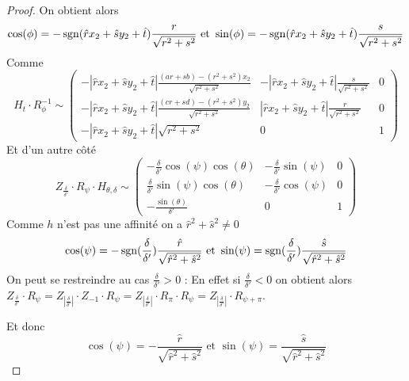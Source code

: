 \begin{proof}
 On obtient alors 
 \begin{equation*}
 \cos( \phi )= -\operatorname{sgn}(\hat r x_2 +\hat s y_2 +\hat t) \frac{r}{\sqrt{r^2 + s^2}} \text{ et } \sin( \phi )= -\operatorname{sgn}(\hat r x_2 +\hat s y_2 +\hat t) \frac{s}{\sqrt{r^2 + s^2}}
 \end{equation*}
 Comme 
 \begin{equation*}
 H_t \cdot R_{\phi}^{-1} \sim
 \begin{pmatrix}
 -|\hat r x_2 +\hat s y_2 +\hat t|\frac{(ar+sb)-(r^2 + s^2)x_2}{\sqrt{r^2 + s^2}}&-|\hat r x_2 +\hat s y_2 +\hat t|\frac{\hat s}{\sqrt{r^2 + s^2}}&0\\
 -|\hat r x_2 +\hat s y_2 +\hat t|\frac{(cr+sd)-(r^2 + s^2)y_2}{\sqrt{r^2 + s^2}}&|\hat r x_2 +\hat s y_2 +\hat t|\frac{r}{\sqrt{r^2 + s^2}}&0\\
 -|\hat r x_2 +\hat s y_2 +\hat t|\sqrt{r^2 + s^2}&0&1
 \end{pmatrix}
 \end{equation*}
 Et d'un autre côté 
 \begin{equation*}
Z_{\frac{\delta}{\delta'}} \cdot R_{\psi} \cdot H_{\theta,\delta}  \sim 
 \begin{pmatrix}
 -\frac{\delta}{\delta'}\cos(\psi)\cos(\theta)&
-\frac{\delta}{\delta'}\sin(\psi)&
0\\
\frac{\delta}{\delta'}\sin(\psi)\cos(\theta)&
-\frac{\delta}{\delta'}\cos(\psi)&
0\\
-\frac{\sin(\theta)}{\delta'}&
0&
1
 \end{pmatrix}
 \end{equation*}
Comme $h$ n'est pas une affinité on a $\hat r^2 + \hat s^2 \ne 0$ 
 \begin{equation*}
  \cos( \psi ) =- \operatorname{sgn}(\frac{\delta}{\delta'})\frac{\hat r}{\sqrt{\hat r^2 + \hat s^2}}\text{ et } \sin( \psi ) = \operatorname{sgn}(\frac{\delta}{\delta'})\frac{\hat s}{\sqrt{\hat r^2 + \hat s^2}}
 \end{equation*}
On peut se restreindre au cas $\frac{\delta}{\delta'}>0$ :
En effet si $\frac{\delta}{\delta'}<0$ on obtient alors $Z_{\frac{\delta}{\delta'}} \cdot R_{\psi}=Z_{\left|\frac{\delta}{\delta'}\right|}\cdot Z_{-1} \cdot R_{\psi}=Z_{\left|\frac{\delta}{\delta'}\right|}\cdot R_{\pi} \cdot R_{\psi}=Z_{\left|\frac{\delta}{\delta'}\right|}\cdot R_{\psi+\pi}$.


Et donc 
 \begin{equation*}
  \cos( \psi ) =- \frac{\hat r}{\sqrt{\hat r^2 + \hat s^2}} \text{ et } \sin( \psi ) = \frac{\hat s}{\sqrt{\hat r^2 + \hat s^2}}
 \end{equation*}




\end{proof}
